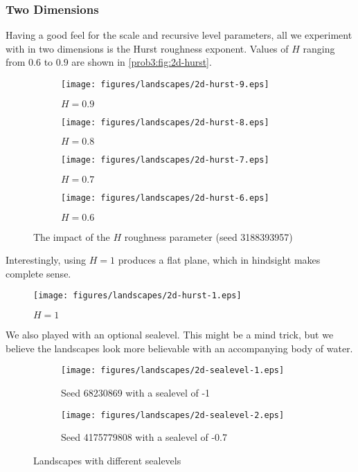\subsubsection{Two Dimensions}
Having a good feel for the scale and recursive level parameters, all we experiment with in two dimensions is the Hurst roughness exponent.
Values of $H$ ranging from $0.6$ to $0.9$ are shown in \autoref{prob3:fig:2d-hurst}.

\begin{figure}[H]
    \centering
    \begin{subfigure}[t]{0.55\textwidth}
        \centering
        \texttt{[image: figures/landscapes/2d-hurst-9.eps]}
        \caption{$H = 0.9$}
    \end{subfigure}%
    \begin{subfigure}[t]{0.55\textwidth}
        \centering
        \texttt{[image: figures/landscapes/2d-hurst-8.eps]}
        \caption{$H = 0.8$}
    \end{subfigure}%

    \begin{subfigure}[b]{0.55\textwidth}
        \centering
        \texttt{[image: figures/landscapes/2d-hurst-7.eps]}
        \caption{$H = 0.7$}
    \end{subfigure}%
    \begin{subfigure}[b]{0.55\textwidth}
        \centering
        \texttt{[image: figures/landscapes/2d-hurst-6.eps]}
        \caption{$H = 0.6$}
    \end{subfigure}%
    \caption{The impact of the $H$ roughness parameter (seed 3188393957)}\label{prob3:fig:2d-hurst}
\end{figure}

Interestingly, using $H=1$ produces a flat plane, which in hindsight makes complete sense.

\begin{figure}[H]
    \centering
    \texttt{[image: figures/landscapes/2d-hurst-1.eps]}
    \caption{$H = 1$}\label{prob3:fig:2d-hurst-1}
\end{figure}

We also played with an optional sealevel.
This might be a mind trick, but we believe the landscapes look more believable with an accompanying body of water.

\begin{figure}[H]
    \centering
    \begin{subfigure}[t]{0.9\textwidth}
        \centering
        \texttt{[image: figures/landscapes/2d-sealevel-1.eps]}
        \caption{Seed 68230869 with a sealevel of -1}
    \end{subfigure}%

    \begin{subfigure}[b]{0.9\textwidth}
        \centering
        \texttt{[image: figures/landscapes/2d-sealevel-2.eps]}
        \caption{Seed 4175779808 with a sealevel of -0.7}
    \end{subfigure}%
    \caption{Landscapes with different sealevels}\label{prob3:fig:2d-sealevel}
\end{figure}
